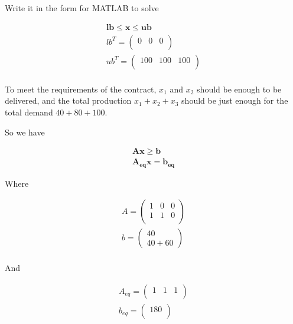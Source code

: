\documentclass[12pt]{article}
\begin{document}
Write it in the form for MATLAB to solve

\begin{equation}
\begin{aligned}
	\mathbf{lb} \le \mathbf{x} \le \mathbf{ub} \\
	lb^T=\left(   
	\begin{array}{ccc} 
		0 & 0 & 0\\
	\end{array}
	\right) \\
	ub^T=\left(   
	\begin{array}{ccc} 
		100 & 100 & 100\\
	\end{array}
	\right) \\
\end{aligned}
\end{equation}

To meet the requirements of the contract, $x_1$ and $x_2$ should be enough to be delivered, and the total production $x_1+x_2+x_3$ should be just enough for the total demand $40+80+100$. 

So we have

\begin{equation}
	\begin{aligned}
	\mathbf{A} \mathbf{x} \ge \mathbf{b}\\
	\mathbf{A_{eq}} \mathbf{x} = \mathbf{b_{eq}}
	\end{aligned}
\end{equation}

Where

\begin{equation}
\begin{aligned}
	A=\left(   
	\begin{array}{ccc} 
		1 & 0 & 0\\
		1 & 1 & 0\\ 
	\end{array}
	\right) \\
	b=\left(   
	\begin{array}{c} 
		40\\
		40+60
	\end{array}
	\right) \\
\end{aligned}
\end{equation}

And

\begin{equation}
	\begin{aligned}
		A_{eq}=\left(   
		\begin{array}{ccc} 
			1 & 1 & 1\\ 
		\end{array}
		\right) \\
		b_{eq}=\left(   
		\begin{array}{c} 
			180\\
		\end{array}
		\right) \\
	\end{aligned}
\end{equation}
\end{document}
